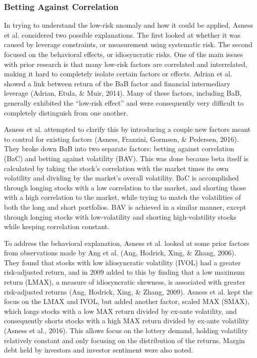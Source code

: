 \documentclass[12pt,twoside]{reedthesis}
\theoremstyle{definition}
\theoremstyle{definition}
\theoremstyle{definition}
\theoremstyle{remark}
\begin{document}
\subsubsection{Betting Against
Correlation}\label{betting-against-correlation}

In trying to understand the low-risk anomaly and how it could be
applied, Asness et al. considered two possible explanations. The first
looked at whether it was caused by leverage constraints, or measurement
using systematic risk. The second focused on the behavioral effects, or
idiosyncratic risks. One of the main issues with prior research is that
many low-risk factors are correlated and interrelated, making it hard to
completely isolate certain factors or effects. Adrian et al. showed a
link between return of the BaB factor and financial intermediary
leverage (Adrian, Etula, \& Muir, 2014). Many of these factors,
including BaB, generally exhibited the ``low-risk effect'' and were
consequently very difficult to completely distinguish from one another.

Asness et al. attempted to clarify this by introducing a couple new
factors meant to control for existing factors (Asness, Frazzini,
Gormsen, \& Pedersen, 2016). They broke down BaB into two separate
factors: betting against correlation (BaC) and betting against
volatility (BAV). This was done because beta itself is calculated by
taking the stock's correlation with the market times its own volatility
and dividing by the market's overall volatility. BaC is accomplished
through longing stocks with a low correlation to the market, and
shorting those with a high correlation to the market, while trying to
match the volatilities of both the long and short portfolios. BAV is
achieved in a similar manner, except through longing stocks with
low-volatility and shorting high-volatility stocks while keeping
correlation constant.

To address the behavioral explanation, Asness et al. looked at some
prior factors from observations made by Ang et al. (Ang, Hodrick, Xing,
\& Zhang, 2006). They found that stocks with low idiosyncratic
volatility (IVOL) had a greater risk-adjusted return, and in 2009 added
to this by finding that a low maximum return (LMAX), a measure of
idiosyncratic skewness, is associated with greater risk-adjusted returns
(Ang, Hodrick, Xing, \& Zhang, 2009). Asness et al. kept the focus on
the LMAX and IVOL, but added another factor, scaled MAX (SMAX), which
longs stocks with a low MAX return divided by ex-ante volatility, and
consequently shorts stocks with a high MAX return divided by ex-ante
volatility (Asness et al., 2016). This allows focus on the lottery
demand, holding volatility relatively constant and only focusing on the
distribution of the returns. Margin debt held by investors and investor
sentiment were also noted.
\end{document}
